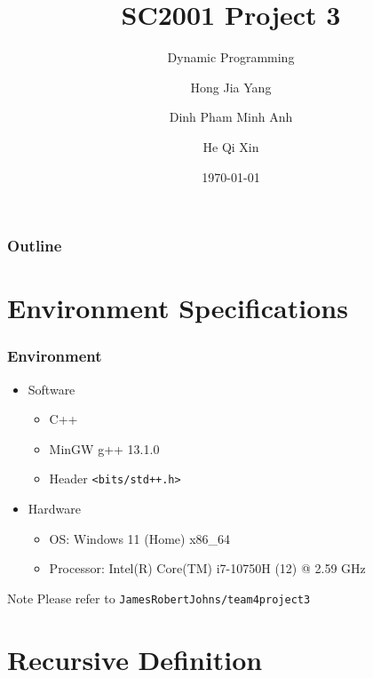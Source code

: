 \documentclass{beamer}
\title{SC2001 Project 3}
\subtitle{Dynamic Programming}
\author[Hong, Dinh, He]{Hong Jia Yang \and Dinh Pham Minh Anh \and He Qi Xin}
\institute{Team 4}
\date{\today}
\begin{document}
\begin{frame}
	\titlepage
\end{frame}

\begin{frame}
	\frametitle{Outline}
	\tableofcontents
\end{frame}

\section{Environment Specifications}
\begin{frame}
	\frametitle{Environment}
	\begin{itemize}
		\item Software
		\begin{itemize}
			\item C++
			\item MinGW g++ 13.1.0	
			\item Header \texttt{<bits/std++.h>} 
		\end{itemize}
		\item Hardware
		\begin{itemize}
			\item OS: Windows 11 (Home) x86\_64
			\item Processor: Intel(R) Core(TM) i7-10750H (12) @ 2.59 GHz
		\end{itemize}	
	\end{itemize}
	\begin{block}{Note}
		Please refer to \texttt{JamesRobertJohns/team4project3}
	\end{block}
\end{frame}



\section{Recursive Definition}
\end{document}
